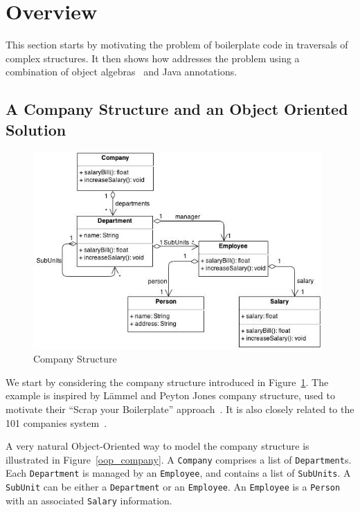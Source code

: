 \section{Overview}\label{subsec:overview}

This section starts by motivating the problem of boilerplate code in
traversals of complex structures. It then shows how \name addresses
the problem using a combination of object algebras~\cite{bruno12oa}
and Java annotations.



\subsection{A Company Structure and an Object Oriented Solution}

\begin{figure}[t]
\centering
\includegraphics[width=110mm]{Company.jpg}
\caption{Company Structure \label{company_structure}}
\end{figure}

We start by considering the company structure introduced in
Figure~\ref{company_structure}. The example is inspired by L\"ammel
and Peyton Jones company structure, used to motivate their ``Scrap
your Boilerplate'' approach~\cite{ralf03syb}. It is also closely
related to the 101 companies system~\cite{Inauguration101}.

A very natural Object-Oriented way to model the company structure is
illustrated in Figure~\ref{oop_company}. A \lstinline{Company}
comprises a list of \lstinline{Department}s. Each
\lstinline{Department} is managed by an \lstinline{Employee},
and contains a list of \lstinline{SubUnits}. A
\lstinline{SubUnit} can be either a \lstinline{Department} or an
\lstinline{Employee}. An \lstinline{Employee} is a \lstinline{Person}
with an associated \lstinline{Salary} information.

